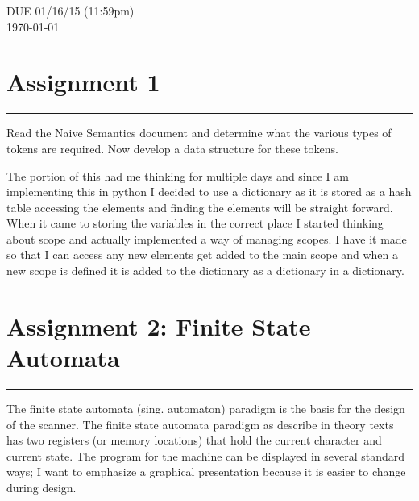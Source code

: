 \documentclass[letterpaper,10pt]{article}
\begin{document}
\begin{titlepage}

DUE 01/16/15 (11:59pm)\\
{\large \today}\\[3cm] %


 

\vfill %

\end{titlepage}

\tableofcontents
\vfill %
\newpage


\section{Assignment 1} \hrule
Read the Naive Semantics document and determine what the various types of tokens are required. Now develop a data structure for these tokens.
\begin{mdframed}[style=MyFrame]
The portion of this had me thinking for multiple days and since I am implementing this in python I decided to use a dictionary as it is stored as a hash table accessing the elements and finding the elements will be straight forward. When it came to storing the variables in the correct place I started thinking about scope and actually implemented a way of managing scopes. I have it made so that I can access any new elements get added to the main scope and when a new scope is defined it is added to the dictionary as a dictionary in a dictionary. 
\end{mdframed}


\section{Assignment 2: Finite State Automata} \hrule
The finite state automata (sing. automaton) paradigm is the basis for the design of the scanner. The finite state automata paradigm as describe in theory texts has two registers (or memory locations) that hold the current character and current state. The program for the machine can be displayed in several standard ways; I want to emphasize a graphical presentation because it is easier to change during design.
\end{document}
